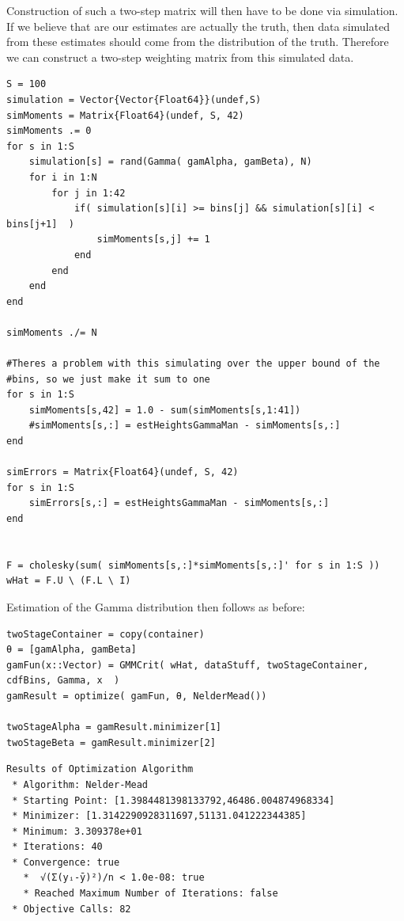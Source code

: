 \documentclass[12pt]{paper}
\begin{document}
Construction of such a two-step matrix will then have to be done via
simulation. If we believe that are our estimates are actually the
truth, then data simulated from these estimates should come from the
distribution of the truth. Therefore we can construct a two-step
weighting matrix from this simulated data.

\begin{verbatim}
S = 100
simulation = Vector{Vector{Float64}}(undef,S)
simMoments = Matrix{Float64}(undef, S, 42)
simMoments .= 0
for s in 1:S
    simulation[s] = rand(Gamma( gamAlpha, gamBeta), N)
    for i in 1:N
        for j in 1:42
            if( simulation[s][i] >= bins[j] && simulation[s][i] < bins[j+1]  )
                simMoments[s,j] += 1
            end
        end
    end
end

simMoments ./= N

#Theres a problem with this simulating over the upper bound of the
#bins, so we just make it sum to one
for s in 1:S
    simMoments[s,42] = 1.0 - sum(simMoments[s,1:41])
    #simMoments[s,:] = estHeightsGammaMan - simMoments[s,:]
end

simErrors = Matrix{Float64}(undef, S, 42)
for s in 1:S
    simErrors[s,:] = estHeightsGammaMan - simMoments[s,:]
end


F = cholesky(sum( simMoments[s,:]*simMoments[s,:]' for s in 1:S ))
wHat = F.U \ (F.L \ I)
\end{verbatim}

Estimation of the Gamma distribution then follows as before:

\begin{verbatim}
twoStageContainer = copy(container)
θ = [gamAlpha, gamBeta]
gamFun(x::Vector) = GMMCrit( wHat, dataStuff, twoStageContainer, cdfBins, Gamma, x  )
gamResult = optimize( gamFun, θ, NelderMead())

twoStageAlpha = gamResult.minimizer[1]
twoStageBeta = gamResult.minimizer[2]
\end{verbatim}

\begin{verbatim}
Results of Optimization Algorithm
 * Algorithm: Nelder-Mead
 * Starting Point: [1.3984481398133792,46486.004874968334]
 * Minimizer: [1.3142290928311697,51131.041222344385]
 * Minimum: 3.309378e+01
 * Iterations: 40
 * Convergence: true
   *  √(Σ(yᵢ-ȳ)²)/n < 1.0e-08: true
   * Reached Maximum Number of Iterations: false
 * Objective Calls: 82
\end{verbatim}
\end{document}
